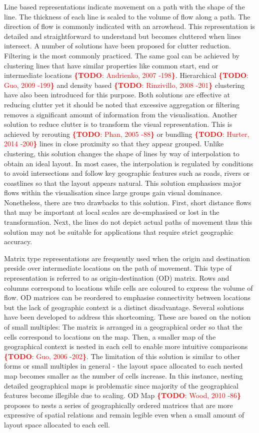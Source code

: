 \documentclass{sig-alternate}
\newcommand{\todo}[1]{\noindent\textcolor{red}{{\bf \{TODO}: #1{\bf \}}}}
\begin{document}
Line based representations indicate movement on a path with the shape of the line. The thickness of each line is scaled to the volume of flow along a path. The direction of flow is commonly indicated with an arrowhead. This representation is detailed and straightforward to understand but becomes cluttered when lines intersect. A number of solutions have been proposed for clutter reduction. Filtering is the most commonly practiced. The same goal can be achieved by clustering lines that have similar properties like common start, end or intermediate locations \todo{Andrienko, 2007 -198}. Hierarchical \todo{Guo, 2009 -199} and density based \todo{Rinzivillo, 2008 -201} clustering have also been introduced for this purpose. Both solutions are effective at reducing clutter yet it should be noted that excessive aggregation or filtering removes a significant amount of information from the visualisation. Another solution to reduce clutter is to transform the visual representation. This is achieved by rerouting \todo{Phan, 2005 -88} or bundling \todo{Hurter, 2014 -200} lines in close proximity so that they appear grouped. Unlike clustering, this solution changes the shape of lines by way of interpolation to obtain an ideal layout. In most cases, the interpolation is regulated by conditions to avoid intersections and follow key geographic features such as roads, rivers or coastlines so that the layout appears natural. This solution emphasises major flows within the visualisation since large groups gain visual dominance. Nonetheless, there are two drawbacks to this solution. First, short distance flows that may be important at local scales are de-emphasised or lost in the transformation. Next, the lines do not depict actual paths of movement thus this solution may not be suitable for applications that require strict geographic accuracy.

Matrix type representations are frequently used when the origin and destination preside over intermediate locations on the path of movement. This type of representation is referred to as origin-destination (OD) matrix. Rows and columns correspond to locations while cells are coloured to express the volume of flow. OD matrices can be reordered to emphasise connectivity between locations but the lack of geographic context is a distinct disadvantage. Several solutions have been developed to address this shortcoming. These are based on the notion of small multiples: The matrix is arranged in a geographical order so that the cells correspond to locations on the map. Then, a smaller map of the geographical context is nested in each cell to enable more intuitive comparisons \todo{Guo, 2006 -202}. The limitation of this solution is similar to other forms or small multiples in general - the layout space allocated to each nested map becomes smaller as the number of cells increase. In this instance, nesting detailed geographical maps is problematic since majority of the geographical features become illegible due to scaling. OD Map \todo{Wood, 2010 -86} proposes to nests a series of geographically ordered matrices that are more expressive of spatial relations and remain legible even when a small amount of layout space allocated to each cell.
\end{document}
